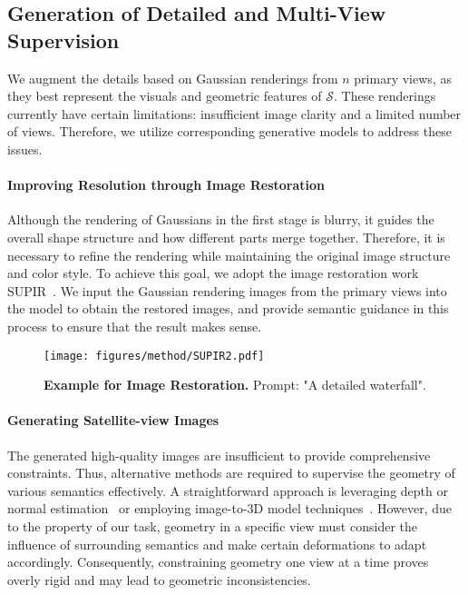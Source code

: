 \subsection{Generation of Detailed and Multi-View Supervision}
\label{3_2}
We augment the details based on Gaussian renderings from $n$ primary views, as they best represent the visuals and geometric features of $\mathcal{S}$. These renderings currently have certain limitations: insufficient image clarity and a limited number of views. Therefore, we utilize corresponding generative models to address these issues.

\paragraph{Improving Resolution through Image Restoration} 
Although the rendering of Gaussians in the first stage is blurry, it guides the overall shape structure and how different parts merge together. 
Therefore, it is necessary to refine the rendering while maintaining the original image structure and color style. To achieve this goal, we adopt the image restoration work SUPIR~\cite{SUPIR}. We input the Gaussian rendering images from the primary views into the model to obtain the restored images, and provide semantic guidance in this process to ensure that the result makes sense.

\begin{figure}[t]
    \centering
    \texttt{[image: figures/method/SUPIR2.pdf]}
    \caption{\textbf{Example for Image Restoration.} Prompt: "A detailed waterfall".}
    \label{fig:SUPIR}
\end{figure}

\paragraph{Generating Satellite-view Images} 
The generated high-quality images are insufficient to provide comprehensive constraints. Thus, alternative methods are required to supervise the geometry of various semantics effectively. A straightforward approach is leveraging depth or normal estimation~\cite{depth_anything_v1,depth_anything_v2,ye2024stablenormal,he2024lotus} or employing image-to-3D model techniques~\cite{tang2024lgm,trellis}. However, due to the property of our task, geometry in a specific view must consider the influence of surrounding semantics and make certain deformations to adapt accordingly. Consequently, constraining geometry one view at a time proves overly rigid and may lead to geometric inconsistencies. 


